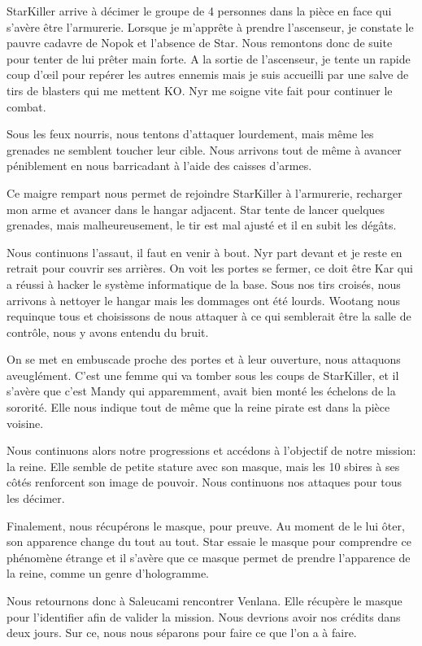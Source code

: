 \documentclass[a4paper,9pt,twoside,twocolumn,openany]{book}
\begin{document}
StarKiller arrive à décimer le groupe de 4 personnes dans la pièce en face qui s’avère être l’armurerie. Lorsque je m’apprête à prendre l’ascenseur, je constate le pauvre cadavre de Nopok et l’absence de Star. Nous remontons donc de suite pour tenter de lui prêter main forte. A la sortie de l'ascenseur, je tente un rapide coup d’œil pour repérer les autres ennemis mais je suis accueilli par une salve de tirs de blasters qui me mettent KO. Nyr me soigne vite fait pour continuer le combat.

Sous les feux nourris, nous tentons d’attaquer lourdement, mais même les grenades ne semblent toucher leur cible. Nous arrivons tout de même à avancer péniblement en nous barricadant à l’aide des caisses d’armes.

Ce maigre rempart nous permet de rejoindre StarKiller à l’armurerie, recharger mon arme et avancer dans le hangar adjacent. Star tente de lancer quelques grenades, mais malheureusement, le tir est mal ajusté et il en subit les dégâts.

Nous continuons l'assaut, il faut en venir à bout. Nyr part devant et je reste en retrait pour couvrir ses arrières. On voit les portes se fermer, ce doit être Kar qui a réussi à hacker le système informatique de la base. Sous nos tirs croisés, nous arrivons à nettoyer le hangar mais les dommages ont été lourds. Wootang nous requinque tous et choisissons de nous attaquer à ce qui semblerait être la salle de contrôle, nous y avons entendu du bruit.

On se met en embuscade proche des portes et à leur ouverture, nous attaquons aveuglément. C’est une femme qui va tomber sous les coups de StarKiller, et il s’avère que c’est Mandy qui apparemment, avait bien monté les échelons de la sororité. Elle nous indique tout de même que la reine pirate est  dans la pièce voisine.

Nous continuons alors notre progressions et accédons à l’objectif de notre mission: la reine. Elle semble de petite stature avec son masque, mais les 10 sbires à ses côtés renforcent son image de pouvoir. Nous continuons nos attaques pour tous les décimer.

Finalement, nous récupérons le masque, pour preuve. Au moment de le lui ôter, son apparence change du tout au tout. Star essaie le masque pour comprendre ce phénomène étrange et il s’avère que ce masque permet de prendre l’apparence de la reine, comme un genre d’hologramme.

Nous retournons donc à Saleucami rencontrer Venlana. Elle récupère le masque pour l’identifier afin de valider la mission. Nous devrions avoir nos crédits dans deux jours. Sur ce, nous nous séparons pour faire ce que l’on a à faire.
\end{document}
